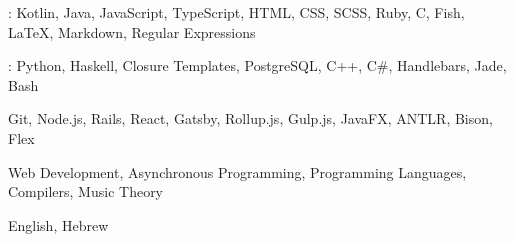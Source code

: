 
\begin{cvparagraph}
    : Kotlin, Java, JavaScript, TypeScript, HTML, CSS, SCSS, Ruby, C, Fish, LaTeX, Markdown, Regular Expressions

    : Python, Haskell, Closure Templates, PostgreSQL, C++, C\#, Handlebars, Jade, Bash

     Git, Node.js, Rails, React, Gatsby, Rollup.js, Gulp.js, JavaFX, ANTLR, Bison, Flex

     Web Development, Asynchronous Programming, Programming Languages, Compilers, Music Theory

     English, Hebrew
\end{cvparagraph}
